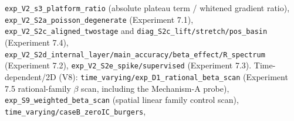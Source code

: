 \documentclass[11pt]{article}
\numberwithin{equation}{section}
\begin{document}
\texttt{exp\_\hspace{0pt}V2\_\hspace{0pt}s3\_\hspace{0pt}platform\_\hspace{0pt}ratio} (absolute plateau term / whitened gradient ratio), \texttt{exp\_\hspace{0pt}V2\_\hspace{0pt}S2a\_\hspace{0pt}poisson\_\hspace{0pt}degenerate} (Experiment 7.1), \texttt{exp\_\hspace{0pt}V2\_\hspace{0pt}S2c\_\hspace{0pt}aligned\_\hspace{0pt}twostage} and \texttt{diag\_\hspace{0pt}S2c\_\hspace{0pt}lift/\hspace{0pt}stretch/\hspace{0pt}pos\_\hspace{0pt}basin} (Experiment 7.4), \texttt{exp\_\hspace{0pt}V2\_\hspace{0pt}S2d\_\hspace{0pt}internal\_\hspace{0pt}layer/\hspace{0pt}main\_\hspace{0pt}accuracy/\hspace{0pt}beta\_\hspace{0pt}effect/\hspace{0pt}R\_\hspace{0pt}spectrum} (Experiment 7.2), \texttt{exp\_\hspace{0pt}V2\_\hspace{0pt}S2e\_\hspace{0pt}spike/\hspace{0pt}supervised} (Experiment 7.3). Time-dependent/2D (V8): \texttt{time\_\hspace{0pt}varying/\hspace{0pt}exp\_\hspace{0pt}D1\_\hspace{0pt}rational\_\hspace{0pt}beta\_\hspace{0pt}scan} (Experiment 7.5 rational-family $\beta$ scan, including the Mechanism-A probe), \texttt{exp\_\hspace{0pt}S9\_\hspace{0pt}weighted\_\hspace{0pt}beta\_\hspace{0pt}scan} (spatial linear family control scan), \texttt{time\_\hspace{0pt}varying/\hspace{0pt}caseB\_\hspace{0pt}zeroIC\_\hspace{0pt}burgers}, 
\end{document}
